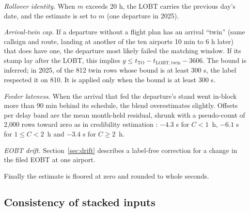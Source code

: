 \documentclass[
  manuscript=article,  %
  layout=preprint,  %
  year=20xx,
  volume=x,
]{extra/joas}
\begin{document}
\textit{Rollover identity.} When $m$ exceeds 20 h, the LOBT carries the previous day's date, and the estimate is set to $m$ (one departure in 2025).

\textit{Arrival-twin cap.} If a departure without a flight plan has an arrival ``twin'' (same callsign and route, landing at another of the ten airports 10 min to 6 h later) that does have one, the departure most likely failed the matching window. If its stamp lay after the LOBT, this implies $y \leq t_{\mathrm{TO}} - t_{\mathrm{LOBT,twin}} - 3606$. The bound is inferred; in 2025, of the 812 twin rows whose bound is at least 300 s, the label respected it on 810. It is applied only when the bound is at least 300 s.

\textit{Feeder lateness.} When the arrival that fed the departure's stand went in-block more than 90 min behind its schedule, the blend overestimates slightly. Offsets per delay band are the mean month-held residual, shrunk with a pseudo-count of 2,000 rows toward zero as in credibility estimation \cite{buhlmann1967experience,efron1975data}: $-4.3$ s for $C<1$~h, $-6.1$ s for $1 \leq C < 2$~h and $-3.4$ s for $C \geq 2$~h.

\textit{EOBT drift.} Section~\ref{sec:drift} describes a label-free correction for a change in the filed EOBT at one airport.

Finally the estimate is floored at zero and rounded to whole seconds.

\subsection{Consistency of stacked inputs}
\label{sec:consistency}
\end{document}

